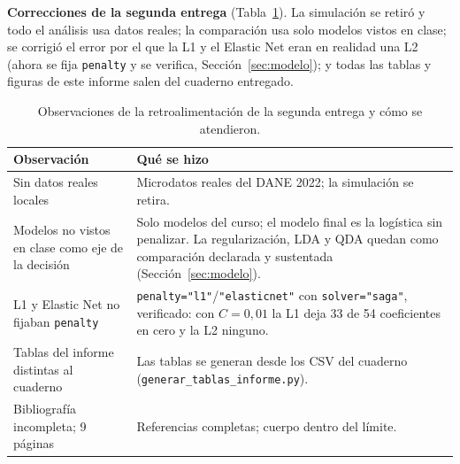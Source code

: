 \documentclass[11pt,a4paper]{article}
\begin{document}
\textbf{Correcciones de la segunda entrega} (Tabla~\ref{tab:correcciones}). La simulación se retiró y todo el análisis usa datos reales; la comparación usa solo modelos vistos en clase; se corrigió el error por el que la L1 y el Elastic Net eran en realidad una L2 (ahora se fija \texttt{penalty} y se verifica, Sección~\ref{sec:modelo}); y todas las tablas y figuras de este informe salen del cuaderno entregado.

\begin{table}[H]
\centering\small
\caption{Observaciones de la retroalimentación de la segunda entrega y cómo se atendieron.}
\label{tab:correcciones}
\begin{tabularx}{\textwidth}{>{\raggedright\arraybackslash}p{5.4cm}X}
\toprule
Observación & Qué se hizo \\
\midrule
Sin datos reales locales & Microdatos reales del DANE 2022; la simulación se retira. \\
Modelos no vistos en clase como eje de la decisión & Solo modelos del curso; el modelo final es la logística sin penalizar. La regularización, LDA y QDA quedan como comparación declarada y sustentada (Sección~\ref{sec:modelo}). \\
L1 y Elastic Net no fijaban \texttt{penalty} & \texttt{penalty="l1"}/\texttt{"elasticnet"} con \texttt{solver="saga"}, verificado: con $C=0{,}01$ la L1 deja 33 de 54 coeficientes en cero y la L2 ninguno. \\
Tablas del informe distintas al cuaderno & Las tablas se generan desde los CSV del cuaderno (\texttt{generar\_tablas\_informe.py}). \\
Bibliografía incompleta; 9 páginas & Referencias completas; cuerpo dentro del límite. \\
\bottomrule
\end{tabularx}
\end{table}
\end{document}
